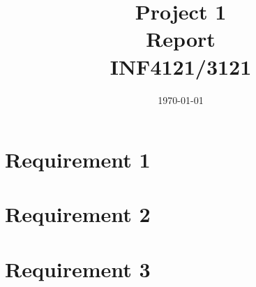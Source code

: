 \documentclass{article}
\title{Project 1 \\ Report \\ INF4121/3121} %
\date{\today} %
\begin{document}
\maketitle %

\section{Requirement 1}

\section{Requirement 2}

\section{Requirement 3}
\end{document}
